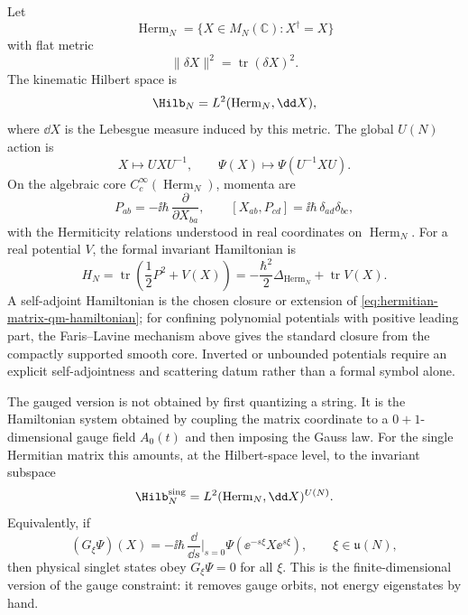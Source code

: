 \begin{definition}
\label{def:hermitian-one-matrix-qm}
Let
\[
  \operatorname{Herm}_N=\{X\in M_N(\mathbb C):X^\dagger=X\}
\]
with flat metric
\[
  \|\delta X\|^2=\operatorname{tr}(\delta X)^2 .
\]
The kinematic Hilbert space is
\[
  \Hilb_N=L^2(\operatorname{Herm}_N,\dd X),
\]
where \(\dd X\) is the Lebesgue measure induced by this metric.  The global
\(U(N)\) action is
\begin{equation}
  X\longmapsto UXU^{-1},
  \qquad
  \Psi(X)\longmapsto \Psi(U^{-1}XU).
  \label{eq:matrix-qm-global-un-action}
\end{equation}
On the algebraic core \(C_c^\infty(\operatorname{Herm}_N)\), momenta are
\begin{equation}
  P_{ab}=-\ii\hbar\,\frac{\partial}{\partial X_{ba}},
  \qquad
  [X_{ab},P_{cd}]=\ii\hbar\,\delta_{ad}\delta_{bc},
  \label{eq:matrix-qm-canonical-commutator}
\end{equation}
with the Hermiticity relations understood in real coordinates on
\(\operatorname{Herm}_N\).  For a real potential \(V\), the formal invariant Hamiltonian is
\begin{equation}
  H_N
  =
  \operatorname{tr}
  \left(\frac12 P^2+V(X)\right)
  =
  -\frac{\hbar^2}{2}\Delta_{\operatorname{Herm}_N}
  +\operatorname{tr}V(X).
  \label{eq:hermitian-matrix-qm-hamiltonian}
\end{equation}
A self-adjoint Hamiltonian is the chosen closure or extension of
\eqref{eq:hermitian-matrix-qm-hamiltonian}; for confining polynomial
potentials with positive leading part, the Faris--Lavine mechanism above
gives the standard closure from the compactly supported smooth core.  Inverted
or unbounded potentials require an explicit self-adjointness and scattering
datum rather than a formal symbol alone.
\end{definition}

The gauged version is not obtained by first quantizing a string.  It is the
Hamiltonian system obtained by coupling the matrix coordinate to a
\(0+1\)-dimensional gauge field \(A_0(t)\) and then imposing the Gauss law.
For the single Hermitian matrix this amounts, at the Hilbert-space level, to
the invariant subspace
\[
  \Hilb_N^{\rm sing}
  =
  L^2(\operatorname{Herm}_N,\dd X)^{U(N)} .
\]
Equivalently, if
\[
  (G_\xi\Psi)(X)
  =
  -\ii\hbar\,\frac{\dd}{\dd s}\bigg|_{s=0}
  \Psi(\ee^{-s\xi}X\ee^{s\xi}),
  \qquad \xi\in\mathfrak u(N),
\]
then physical singlet states obey \(G_\xi\Psi=0\) for all \(\xi\).  This is
the finite-dimensional version of the gauge constraint: it removes gauge
orbits, not energy eigenstates by hand.

